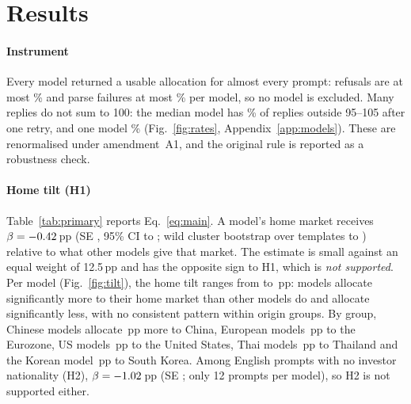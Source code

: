 \section{Results}\label{sec:results}

\paragraph*{Instrument} Every model returned a usable allocation for almost every prompt: refusals are at most \% and parse failures at most \failMax\% per model, so no model is excluded. Many replies do not sum to 100: the median model has \renormWideMedian\% of replies outside 95--105 after one retry, and one model \renormWideMax\% (Fig.~\ref{fig:rates}, Appendix~\ref{app:models}). These are renormalised under amendment~A1, and the original rule is reported as a robustness check.

\paragraph*{Home tilt (H1)} Table~\ref{tab:primary} reports Eq.~\eqref{eq:main}. A model's home market receives $\beta=-0.42{}$\,pp (SE \betaHomeSE{}, 95\% CI \betaHomeLo{} to \betaHomeHi{}; wild cluster bootstrap over templates \betaWildLo{} to \betaWildHi{}) relative to what other models give that market. The estimate is small against an equal weight of 12.5\,pp and has the opposite sign to H1, which is \emph{not supported}. Per model (Fig.~\ref{fig:tilt}), the home tilt ranges from \tiltMin{} to \tiltMax{}\,pp: \nTiltPos{} models allocate significantly more to their home market than other models do and \nTiltNeg{} allocate significantly less, with no consistent pattern within origin groups. By group, Chinese models allocate \betaChina{}\,pp more to China, European models \betaEurope{}\,pp to the Eurozone, US models \betaUnitedstates{}\,pp to the United States, Thai models \betaThailand{}\,pp to Thailand and the Korean model \betaKorea{}\,pp to South Korea. Among English prompts with no investor nationality (H2), $\beta=-1.02{}$\,pp (SE \betaHtwoSE{}; only 12 prompts per model), so H2 is not supported either.

\begin{table}[htbp]
\caption{Primary and secondary estimates. Weights in percentage points; SEs clustered by prompt except where noted. $N$ counts model $\times$ prompt $\times$ market observations.}
\label{tab:primary}
\centering\footnotesize

\end{table}


